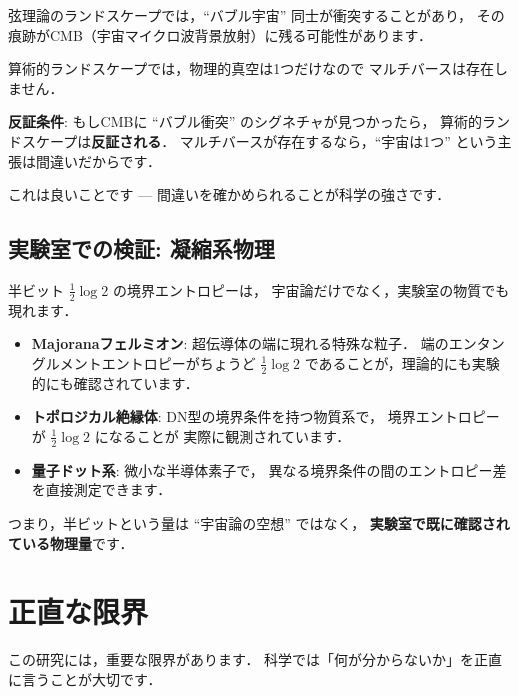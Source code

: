 \documentclass[11pt,a4paper]{article}
\begin{document}
弦理論のランドスケープでは，``バブル宇宙'' 同士が衝突することがあり，
その痕跡がCMB（宇宙マイクロ波背景放射）に残る可能性があります．

算術的ランドスケープでは，物理的真空は1つだけなので
マルチバースは存在しません．

\begin{tcolorbox}[colback=red!5,colframe=red!50!black]
\textbf{反証条件}: もしCMBに ``バブル衝突'' のシグネチャが見つかったら，
算術的ランドスケープは\textbf{反証される}．
マルチバースが存在するなら，``宇宙は1つ'' という主張は間違いだからです．

これは良いことです --- 間違いを確かめられることが科学の強さです．
\end{tcolorbox}

\subsection{実験室での検証: 凝縮系物理}

半ビット $\frac{1}{2}\log 2$ の境界エントロピーは，
宇宙論だけでなく，実験室の物質でも現れます．

\begin{itemize}
\item \textbf{Majoranaフェルミオン}: 超伝導体の端に現れる特殊な粒子．
端のエンタングルメントエントロピーがちょうど $\frac{1}{2}\log 2$
であることが，理論的にも実験的にも確認されています．

\item \textbf{トポロジカル絶縁体}: DN型の境界条件を持つ物質系で，
境界エントロピーが $\frac{1}{2}\log 2$ になることが
実際に観測されています．

\item \textbf{量子ドット系}: 微小な半導体素子で，
異なる境界条件の間のエントロピー差を直接測定できます．
\end{itemize}

つまり，半ビットという量は ``宇宙論の空想'' ではなく，
\textbf{実験室で既に確認されている物理量}です．

\section{正直な限界}

この研究には，重要な限界があります．
科学では「何が分からないか」を正直に言うことが大切です．
\end{document}
